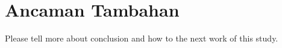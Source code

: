 \chapter{Ancaman Tambahan}
Please tell more about conclusion and how to the next work of this study.
